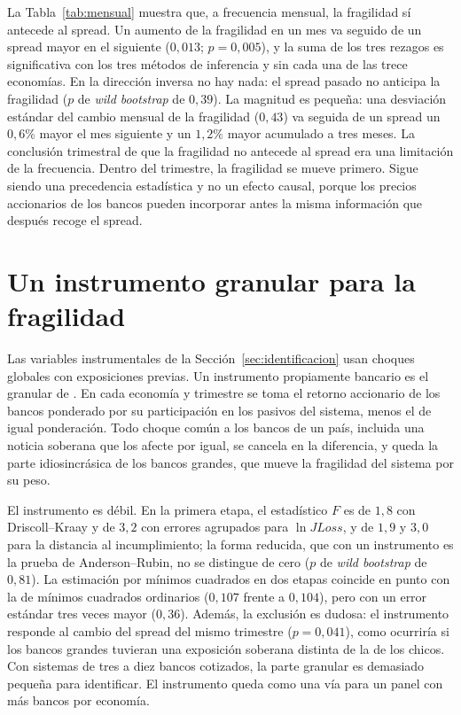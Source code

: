 La Tabla~\ref{tab:mensual} muestra que, a frecuencia mensual, la fragilidad sí antecede al spread. Un aumento de la fragilidad en un mes va seguido de un spread mayor en el siguiente ($0{,}013$; $p=0{,}005$), y la suma de los tres rezagos es significativa con los tres métodos de inferencia y sin cada una de las trece economías. En la dirección inversa no hay nada: el spread pasado no anticipa la fragilidad ($p$ de \textit{wild bootstrap} de $0{,}39$). La magnitud es pequeña: una desviación estándar del cambio mensual de la fragilidad ($0{,}43$) va seguida de un spread un $0{,}6\%$ mayor el mes siguiente y un $1{,}2\%$ mayor acumulado a tres meses. La conclusión trimestral de que la fragilidad no antecede al spread era una limitación de la frecuencia. Dentro del trimestre, la fragilidad se mueve primero. Sigue siendo una precedencia estadística y no un efecto causal, porque los precios accionarios de los bancos pueden incorporar antes la misma información que después recoge el spread.

\section{Un instrumento granular para la fragilidad}
\label{sec:giv}

Las variables instrumentales de la Sección~\ref{sec:identificacion} usan choques globales con exposiciones previas. Un instrumento propiamente bancario es el granular de \citet{GabaixKoijen2024}. En cada economía y trimestre se toma el retorno accionario de los bancos ponderado por su participación en los pasivos del sistema, menos el de igual ponderación. Todo choque común a los bancos de un país, incluida una noticia soberana que los afecte por igual, se cancela en la diferencia, y queda la parte idiosincrásica de los bancos grandes, que mueve la fragilidad del sistema por su peso.

El instrumento es débil. En la primera etapa, el estadístico $F$ es de $1{,}8$ con Driscoll--Kraay y de $3{,}2$ con errores agrupados para $\ln JLoss$, y de $1{,}9$ y $3{,}0$ para la distancia al incumplimiento; la forma reducida, que con un instrumento es la prueba de Anderson--Rubin, no se distingue de cero ($p$ de \textit{wild bootstrap} de $0{,}81$). La estimación por mínimos cuadrados en dos etapas coincide en punto con la de mínimos cuadrados ordinarios ($0{,}107$ frente a $0{,}104$), pero con un error estándar tres veces mayor ($0{,}36$). Además, la exclusión es dudosa: el instrumento responde al cambio del spread del mismo trimestre ($p=0{,}041$), como ocurriría si los bancos grandes tuvieran una exposición soberana distinta de la de los chicos. Con sistemas de tres a diez bancos cotizados, la parte granular es demasiado pequeña para identificar. El instrumento queda como una vía para un panel con más bancos por economía.

